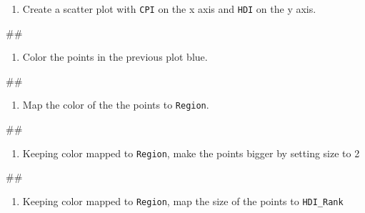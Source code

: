 \documentclass[]{book}
\newenvironment{Shaded}{\begin{snugshade}}{\end{snugshade}}
\newcommand{\NormalTok}[1]{#1}
\providecommand{\tightlist}{%
  \setlength{\itemsep}{0pt}\setlength{\parskip}{0pt}}
\begin{document}
\begin{enumerate}
\def\labelenumi{\arabic{enumi}.}
\tightlist
\item
  Create a scatter plot with \texttt{CPI} on the x axis and \texttt{HDI}
  on the y axis.
\end{enumerate}

\begin{Shaded}
\begin{Highlighting}[]
\NormalTok{## }
\end{Highlighting}
\end{Shaded}

\begin{enumerate}
\def\labelenumi{\arabic{enumi}.}
\setcounter{enumi}{1}
\tightlist
\item
  Color the points in the previous plot blue.
\end{enumerate}

\begin{Shaded}
\begin{Highlighting}[]
\NormalTok{## }
\end{Highlighting}
\end{Shaded}

\begin{enumerate}
\def\labelenumi{\arabic{enumi}.}
\setcounter{enumi}{2}
\tightlist
\item
  Map the color of the the points to \texttt{Region}.
\end{enumerate}

\begin{Shaded}
\begin{Highlighting}[]
\NormalTok{## }
\end{Highlighting}
\end{Shaded}

\begin{enumerate}
\def\labelenumi{\arabic{enumi}.}
\setcounter{enumi}{3}
\tightlist
\item
  Keeping color mapped to \texttt{Region}, make the points bigger by
  setting size to 2
\end{enumerate}

\begin{Shaded}
\begin{Highlighting}[]
\NormalTok{## }
\end{Highlighting}
\end{Shaded}

\begin{enumerate}
\def\labelenumi{\arabic{enumi}.}
\setcounter{enumi}{4}
\tightlist
\item
  Keeping color mapped to \texttt{Region}, map the size of the points to
  \texttt{HDI\_Rank}
\end{enumerate}
\end{document}
